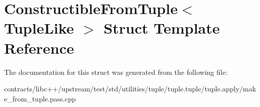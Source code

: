 \hypertarget{struct_constructible_from_tuple}{}\section{Constructible\+From\+Tuple$<$ Tuple\+Like $>$ Struct Template Reference}
\label{struct_constructible_from_tuple}


The documentation for this struct was generated from the following file\+:\begin{DoxyCompactItemize}
\item 
contracts/libc++/upstream/test/std/utilities/tuple/tuple.\+tuple/tuple.\+apply/make\+\_\+from\+\_\+tuple.\+pass.\+cpp\end{DoxyCompactItemize}
